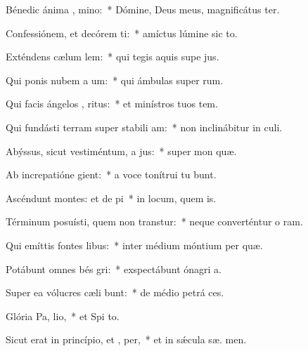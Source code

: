 \item Bénedic ánima , mino:~* Dómine, Deus meus, magnificátus  ter.
\item Confessiónem, et decórem ti:~* amíctus lúmine sic to.
\item Exténdens cælum  lem:~* qui tegis aquis supe jus.
\item Qui ponis nubem a um:~* qui ámbulas super  rum.
\item Qui facis ángelos , ritus:~* et minístros tuos  tem.
\item Qui fundásti terram super stabili am:~* non inclinábitur in  culi.
\item Abýssus, sicut vestiméntum, a jus:~* super mon  quæ.
\item Ab increpatióne  gient:~* a voce tonítrui tu bunt.
\item Ascéndunt montes: et de pi~* in locum, quem  is.
\item Términum posuísti, quem non transtur:~* neque converténtur o ram.
\item Qui emíttis fontes  libus:~* inter médium móntium per quæ.
\item Potábunt omnes bés gri:~* exspectábunt ónagri   a.
\item Super ea vólucres cæli bunt:~* de médio petrá  ces.
\item Glória Pa,  lio,~* et Spi to.
\item Sicut erat in princípio, et ,  per,~* et in sǽcula sæ. men.
